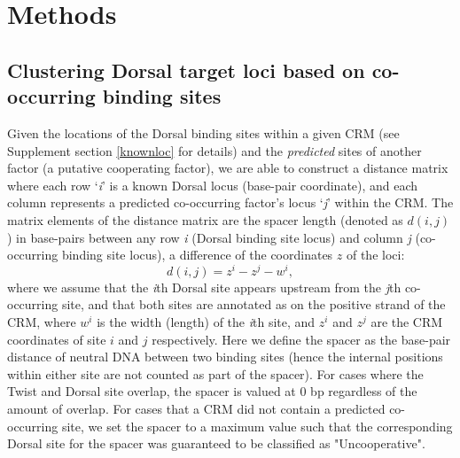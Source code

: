 

%
\section{Methods}

\subsection{Clustering Dorsal target loci based on co-occurring binding sites}
Given the locations of the Dorsal binding sites within a given CRM (see Supplement section \ref{knownloc} for details) and the \textit{predicted} sites of another factor (a putative cooperating factor), we are able to construct a distance matrix where each row `\textit{i}' is a known Dorsal locus (base-pair coordinate), and each column represents a predicted co-occurring factor's locus `\textit{j}' within the CRM.  The matrix elements of the distance matrix are the spacer length (denoted as $d(i,j)$ ) in base-pairs between any row \textit{i} (Dorsal binding site locus) and column \textit{j} (co-occurring binding site locus), a difference of the coordinates $z$ of the loci:
\begin{equation}\label{cluster}
d(i,j) = z^i - z^j -w^i,
\end{equation}
where we assume that the \textit{i}th Dorsal site appears upstream from the \textit{j}th co-occurring site, and that both sites are annotated as on the positive strand of the CRM, where $w^i$ is the width (length) of the \textit{i}th site, and $z^i$ and $z^j$ are the CRM coordinates of site $i$ and $j$ respectively.  Here we define the spacer as the base-pair distance of neutral DNA between two binding sites (hence the internal positions within either site are not counted as part of the spacer).  For cases where the Twist and Dorsal site overlap, the spacer is valued at 0 bp regardless of the amount of overlap.  For cases that a CRM did not contain a predicted co-occurring site, we set the spacer to a maximum value such that the corresponding Dorsal site for the spacer was guaranteed to be classified as "Uncooperative".

